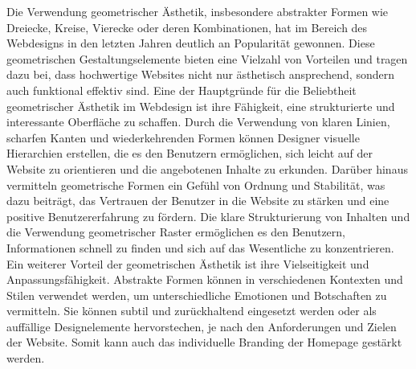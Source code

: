 Die Verwendung geometrischer Ästhetik, insbesondere abstrakter Formen wie Dreiecke, Kreise, Vierecke oder deren Kombinationen, 
hat im Bereich des Webdesigns in den letzten Jahren deutlich an Popularität gewonnen. Diese geometrischen Gestaltungselemente bieten eine 
Vielzahl von Vorteilen und tragen dazu bei, dass hochwertige Websites nicht nur ästhetisch ansprechend, sondern auch funktional effektiv sind.
Eine der Hauptgründe für die Beliebtheit geometrischer Ästhetik im Webdesign ist ihre Fähigkeit, eine strukturierte und interessante 
Oberfläche zu schaffen. Durch die Verwendung von klaren Linien, scharfen Kanten und wiederkehrenden Formen können Designer visuelle 
Hierarchien erstellen, die es den Benutzern ermöglichen, sich leicht auf der Website zu orientieren und die angebotenen Inhalte zu erkunden.
Darüber hinaus vermitteln geometrische Formen ein Gefühl von Ordnung und Stabilität, was dazu beiträgt, das Vertrauen der Benutzer 
in die Website zu stärken und eine positive Benutzererfahrung zu fördern. Die klare Strukturierung von Inhalten und die Verwendung 
geometrischer Raster ermöglichen es den Benutzern, Informationen schnell zu finden und sich auf das Wesentliche zu konzentrieren.
Ein weiterer Vorteil der geometrischen Ästhetik ist ihre Vielseitigkeit und Anpassungsfähigkeit. Abstrakte Formen können in 
verschiedenen Kontexten und Stilen verwendet werden, um unterschiedliche Emotionen und Botschaften zu vermitteln. Sie können subtil und 
zurückhaltend eingesetzt werden oder als auffällige Designelemente hervorstechen, je nach den Anforderungen und Zielen der Website. 
Somit kann auch das individuelle Branding der Homepage gestärkt werden.



